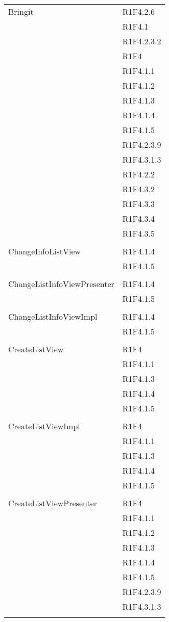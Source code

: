 \begin{center}
\begin{longtable}{|p{7cm}|p{7cm}|}
		Bringit & R1F4.2.6 \\ & R1F4.1 \\ & R1F4.2.3.2 \\ & R1F4 \\ & R1F4.1.1 \\ & R1F4.1.2 \\ & R1F4.1.3 \\ & R1F4.1.4 \\ & R1F4.1.5 \\ & R1F4.2.3.9 \\ & R1F4.3.1.3 \\ & R1F4.2.2 \\ & R1F4.3.2 \\ & R1F4.3.3 \\ & R1F4.3.4 \\ & R1F4.3.5 \\ & \\ \hline
		ChangeInfoListView & R1F4.1.4 \\ & R1F4.1.5 \\ & \\ \hline
		ChangeListInfoViewPresenter & R1F4.1.4 \\ & R1F4.1.5 \\ & \\ \hline
		ChangeListInfoViewImpl & R1F4.1.4 \\ & R1F4.1.5 \\ & \\ \hline
		CreateListView & R1F4 \\ & R1F4.1.1 \\ & R1F4.1.3 \\ & R1F4.1.4 \\ & R1F4.1.5 \\ & \\ \hline
		CreateListViewImpl & R1F4 \\ & R1F4.1.1 \\ & R1F4.1.3 \\ & R1F4.1.4 \\ & R1F4.1.5 \\ & \\ \hline
		CreateListViewPresenter & R1F4 \\ & R1F4.1.1 \\ & R1F4.1.2 \\ & R1F4.1.3 \\ & R1F4.1.4 \\ & R1F4.1.5 \\ & R1F4.2.3.9 \\ & R1F4.3.1.3 \\ & \\ \hline

\end{longtable}
\end{center}
